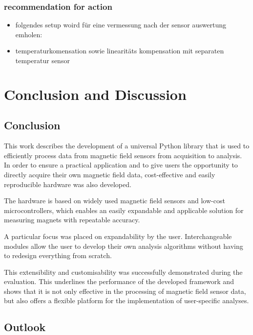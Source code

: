 \hypertarget{recommendation-for-action}{%
\subsection{recommendation for action}\label{recommendation-for-action}}

\begin{itemize}
\tightlist
\item
  folgendes setup woird für eine vermessung nach der sensor auswertung
  emholen:
\item
  temperaturkomensation sowie linearitäts kompensation mit separaten
  temperatur sensor
\end{itemize}

\hypertarget{conclusion-and-discussion}{%
\chapter{Conclusion and Discussion}\label{conclusion-and-discussion}}

\hypertarget{conclusion}{%
\section{Conclusion}\label{conclusion}}

This work describes the development of a universal Python library that
is used to efficiently process data from magnetic field sensors from
acquisition to analysis. In order to ensure a practical application and
to give users the opportunity to directly acquire their own magnetic
field data, cost-effective and easily reproducible hardware was also
developed.

The hardware is based on widely used magnetic field sensors and low-cost
microcontrollers, which enables an easily expandable and applicable
solution for measuring magnets with repeatable accuracy.

A particular focus was placed on expandability by the user.
Interchangeable modules allow the user to develop their own analysis
algorithms without having to redesign everything from scratch.

This extensibility and customisability was successfully demonstrated
during the evaluation. This underlines the performance of the developed
framework and shows that it is not only effective in the processing of
magnetic field sensor data, but also offers a flexible platform for the
implementation of user-specific analyses.

\hypertarget{outlook}{%
\section{Outlook}\label{outlook}}

